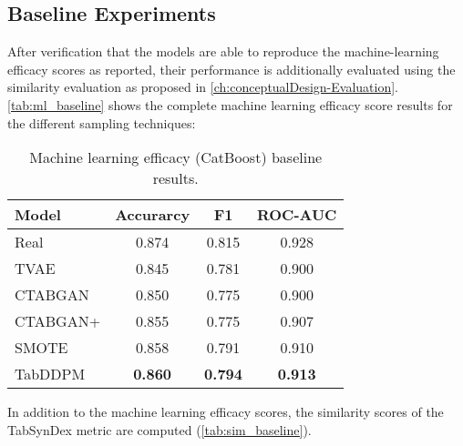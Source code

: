 
\subsection[]{Baseline Experiments}
\label{ch:Baseline}

After verification that the models are able to reproduce the machine-learning efficacy scores as reported,
their performance is additionally evaluated using the similarity evaluation as proposed in \autoref{ch:conceptualDesign-Evaluation}.
\autoref{tab:ml_baseline} shows the complete machine learning efficacy score results for the different sampling techniques:

\begin{table}[h]
	\centering
	\begin{tabular}{l|c|c|c}
		\hline
		\textbf{Model} & \textbf{Accurarcy} & \textbf{F1}    & \textbf{ROC-AUC} \\ \hline
		Real           & 0.874              & 0.815          & 0.928            \\ \hline
		TVAE           & 0.845              & 0.781          & 0.900            \\ \hline
		CTABGAN        & 0.850              & 0.775          & 0.900            \\ \hline
		CTABGAN+       & 0.855              & 0.775          & 0.907            \\ \hline
		SMOTE          & 0.858              & 0.791          & 0.910            \\ \hline
		TabDDPM        & \textbf{0.860}     & \textbf{0.794} & \textbf{0.913}   \\ \hline
	\end{tabular}
	\caption[Machine learning efficacy baseline]{Machine learning efficacy (CatBoost) baseline results.}
	\label{tab:ml_baseline}
\end{table}


In addition to the machine learning efficacy scores, the similarity scores of the TabSynDex metric are computed (\autoref{tab:sim_baseline}).

